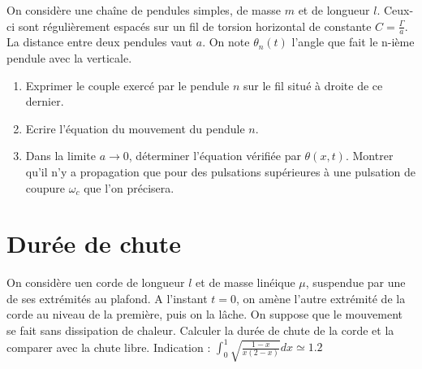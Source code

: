 \documentclass{article}
\begin{document}
On considère une chaîne de pendules simples, de masse $m$ et de longueur $l$. Ceux-ci sont régulièrement
espacés sur un fil de torsion horizontal de constante $C=\frac{\Gamma} {a}$. 
La distance entre deux pendules vaut $a$. 
On note $\theta_n(t)$ l'angle que fait le n-ième pendule avec la verticale.
\begin{enumerate}
  \item Exprimer le couple exercé par le pendule $n$ sur le fil situé à droite de ce dernier. 
  \item Ecrire l'équation du mouvement du pendule $n$.
  \item Dans la limite $  a \rightarrow 0$, déterminer l'équation vérifiée par $\theta (x,t)$. Montrer qu'il n'y a propagation que pour des pulsations supérieures à une pulsation de coupure $\omega_c$ que l'on précisera. 
\end{enumerate}

\section{Durée de chute}
On considère uen corde de longueur $l$ et de masse linéique $\mu$, suspendue par une de ses extrémités au plafond. 
A l'instant $t=0$, on amène l'autre extrémité de la corde au niveau de la première, puis on la lâche.
On suppose que le mouvement se fait sans dissipation de chaleur.
Calculer la durée de chute de la corde et la comparer avec la chute libre. 
Indication : $\int_{0}^{1}\sqrt{\frac{1-x}{x(2-x)} } dx \simeq 1.2$
\end{document}
